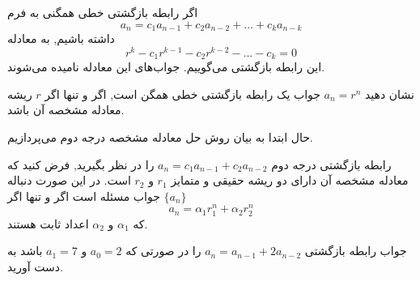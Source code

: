 
\begin{DEFINITION}
    \p
    اگر رابطه‌ بازگشتی خطی همگنی به فرم
    \[a_n=c_{1}a_{n-1}+c_{2}a_{n-2}+...+c_{k}a_{n-k}\]
    داشته باشیم, به معادله
    \[r^k-c_{1}r^{k-1}-c_{2}r^{k-2}-...-c_{k}=0\]
     این رابطه‌ بازگشتی می‌گوییم.
     جواب‌های این معادله 
    نامیده می‌شوند.

\end{DEFINITION}
\begin{PROBLEM}
    \p
    نشان دهید
    $a_n=r^n$
    جواب یک رابطه‌ بازگشتی خطی همگن است, اگر و تنها اگر 
    $r$
    ریشه معادله مشخصه آن باشد.
\end{PROBLEM}
\p
حال
ابتدا به بیان روش حل معادله مشخصه درجه دوم می‌پردازیم.
\begin{THEOREM}
    \p
    رابطه‌ بازگشتی درجه دوم
    $a_n=c_1 a_{n-1}+c_2 a_{n-2}$
    را در نظر بگیرید, فرض کنید که معادله مشخصه آن دارای دو ریشه حقیقی و متمایز 
    $r_1$ و $r_2$
    است.
    در این صورت دنباله 
    $\{a_n\}$
    جواب مسئله است اگر و تنها اگر
    \[a_n=\alpha_1 r_1^n+\alpha_2 r_2^n\]
    که
    $\alpha_1$
    و
    $\alpha_2$
    اعداد ثابت هستند.

\end{THEOREM}
\begin{PROBLEM}
    \p
    جواب رابطه‌ بازگشتی 
    $a_n=a_{n-1}+2a_{n-2}$
    را در صورتی که
    $a_0=2$
    و
    $a_1=7$
    باشد به دست آورید.
\end{PROBLEM}
